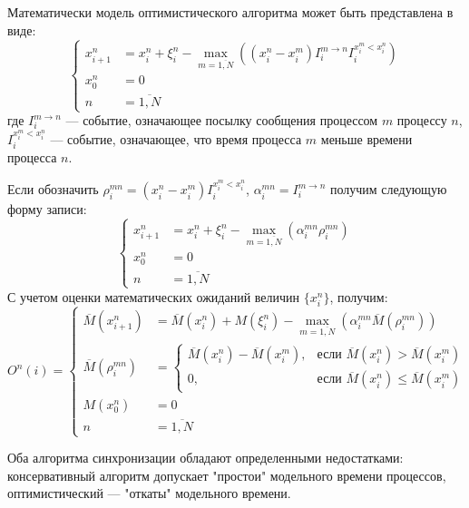 Математически модель оптимистического алгоритма может быть представлена в виде:
\begin{equation}
\label{eq:АС с синхронизацией взаимодействий}
\left\{
\begin{aligned}
x_{i+1}^n & = x_i^n + \xi_i^n-\max\limits_{m=\overline{1, N}}((x_i^n-x_i^m)I_i^{m\rightarrow n}I_i^{x_i^m<x_i^n})\\
x_0^n & = 0\\
n & = \overline{1, N}
\end{aligned}
\right.
\end{equation}
где $I_i^{m\rightarrow n}$ --- событие, означающее посылку сообщения процессом $m$ процессу $n$, $I_i^{x_i^m<x_i^n}$ --- событие, означающее, что время процесса $m$ меньше времени процесса $n$.

Если обозначить $\rho_i^{mn}=(x_i^n-x_i^m)I_i^{x_i^m<x_i^n}$, $\alpha_i^{mn}=I_i^{m\rightarrow n}$ получим следующую форму записи:
\begin{equation}
\label{eq:АС с синхронизацией взаимодействий}
\left\{
\begin{aligned}
x_{i+1}^n & = x_i^n + \xi_i^n-\max\limits_{m=\overline{1, N}}(\alpha_i^{mn}\rho_i^{mn})\\
x_0^n & = 0\\
n & = \overline{1, N}
\end{aligned}
\right.
\end{equation}
С учетом оценки математических ожиданий величин $\{x_i^{n}\}$, получим:
\begin{equation}
\label{eq:АС с синхронизацией взаимодействий}
O^n(i)=
\left\{
\begin{aligned}
\overline{M}(x_{i+1}^n) & = \overline{M}(x_i^n) + M(\xi_i^n)-\max\limits_{m=\overline{1, N}}(\alpha_i^{mn}\overline{M}(\rho_i^{mn}))\\
\overline{M}(\rho_i^{mn}) & = \begin{cases}
\overline{M}(x_i^n)-\overline{M}(x_i^m), & \text{если $\overline{M}(x_i^n)>\overline{M}(x_i^m)$} \\
 0, & \text{если $\overline{M}(x_i^n)\leqslant\overline{M}(x_i^m)$}
 \end{cases}\\
M(x_0^n) & = 0\\
n & = \overline{1, N}
\end{aligned}
\right.
\end{equation}

Оба алгоритма синхронизации обладают определенными недостатками: консервативный алгоритм допускает "простои" модельного времени процессов, оптимистический --- "откаты" модельного времени.

